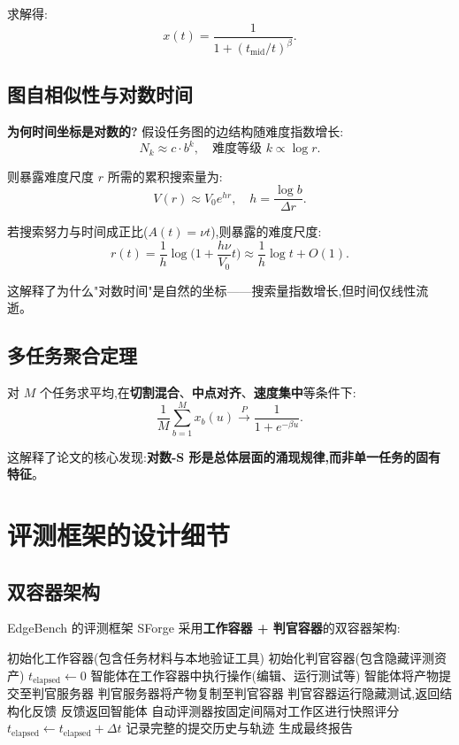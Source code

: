 \documentclass[a4paper,11pt]{article}
\begin{document}
求解得:
\[
    x(t) = \frac{1}{1 + (t_{\mathrm{mid}}/t)^{\beta}}.
\tag{ALG-6}
\]

\subsection{图自相似性与对数时间}

\textbf{为何时间坐标是对数的?} 假设任务图的边结构随难度指数增长:
\[
    N_{k} \approx c \cdot b^{k}, \quad \text{难度等级 } k \propto \log r.
\]

则暴露难度尺度 $r$ 所需的累积搜索量为:
\[
    V(r) \approx V_{0} e^{h r}, \quad h = \frac{\log b}{\Delta r}.
\]

若搜索努力与时间成正比($A(t) = \nu t$),则暴露的难度尺度:
\[
    r(t) = \frac{1}{h}\log\!\bigl(1 + \frac{h\nu}{V_{0}}t\bigr) \approx \frac{1}{h}\log t + O(1).
\]

这解释了为什么"对数时间"是自然的坐标——搜索量指数增长,但时间仅线性流逝。

\subsection{多任务聚合定理}

对 $M$ 个任务求平均,在\textbf{切割混合}、\textbf{中点对齐}、\textbf{速度集中}等条件下:
\[
    \frac{1}{M}\sum_{b=1}^{M} x_{b}(u) \xrightarrow{P} \frac{1}{1 + e^{-\beta u}}.
\tag{ALG-7}
\]

这解释了论文的核心发现:\textbf{对数-S 形是总体层面的涌现规律,而非单一任务的固有特征}。

\section{评测框架的设计细节}

\subsection{双容器架构}

EdgeBench 的评测框架 SForge 采用\textbf{工作容器 + 判官容器}的双容器架构:

\begin{algorithm}[H]
\caption{EdgeBench 评测循环(高层描述)}
\label{alg:eval-loop}
\begin{algorithmic}[1]
\STATE 初始化工作容器(包含任务材料与本地验证工具)
\STATE 初始化判官容器(包含隐藏评测资产)
\STATE $t_{\mathrm{elapsed}} \gets 0$
    \STATE 智能体在工作容器中执行操作(编辑、运行测试等)
    \STATE 智能体将产物提交至判官服务器
    \STATE 判官服务器将产物复制至判官容器
    \STATE 判官容器运行隐藏测试,返回结构化反馈
    \STATE 反馈返回智能体
    \STATE 自动评测器按固定间隔对工作区进行快照评分
    \STATE $t_{\mathrm{elapsed}} \gets t_{\mathrm{elapsed}} + \Delta t$
\ENDWHILE
\STATE 记录完整的提交历史与轨迹
\STATE 生成最终报告
\end{algorithmic}
\end{algorithm}
\end{document}
